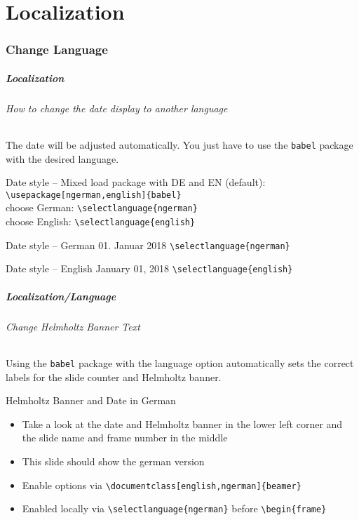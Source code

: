 \part{Localization}
\makepart
\section{Change Language}
\begin{frame}[fragile,label=localization]
        \frametitle{Localization}
        \framesubtitle{How to change the date display to another language}
        The date will be adjusted automatically. You just have to use the {\tt babel}
        package with the desired language.
        \begin{block}{Date style -- Mixed}
                load package with DE and EN (default): \hfill \verb+\usepackage[ngerman,english]{babel}+\\
                choose German: \hfill \verb+\selectlanguage{ngerman}+\\
                choose English: \hfill \verb+\selectlanguage{english}+
        \end{block}
        \begin{block}{Date style -- German}
                01. Januar 2018 \hfill
                \verb+\selectlanguage{ngerman}+
        \end{block}
        \begin{block}{Date style -- English}
                January 01, 2018 \hfill
                \verb+\selectlanguage{english}+
        \end{block}

\end{frame}

\begin{frame}[fragile,,label=translation]
        \frametitle{Localization/Language}
        \framesubtitle{Change Helmholtz Banner Text}
        Using the \texttt{babel} package with the language option automatically sets
        the correct labels for the slide counter and Helmholtz banner.

        \begin{block}{Helmholtz Banner and Date in German}
        \begin{itemize}
          \item Take a look at the date and Helmholtz banner in the lower left
          corner and the slide name and frame number in the middle
          \item This slide should show the german version
          \item Enable options via \verb+\documentclass[english,ngerman]{beamer}+
          \item Enabled locally via \verb+\selectlanguage{ngerman}+ before
          \verb+\begin{frame}+
        \end{itemize}
        \end{block}
\end{frame}

\author{Your Name}
